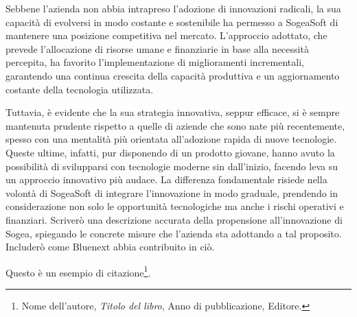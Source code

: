 Sebbene l'azienda non abbia intrapreso l'adozione di innovazioni radicali, la sua capacità di evolversi in modo costante e sostenibile ha permesso a SogeaSoft di mantenere una posizione competitiva nel mercato. L'approccio adottato, che prevede l'allocazione di risorse umane e finanziarie in base alla necessità percepita, ha favorito l'implementazione di miglioramenti incrementali, garantendo una continua crescita della capacità produttiva e un aggiornamento costante della tecnologia utilizzata. 

Tuttavia, è evidente che la sua strategia innovativa, seppur efficace, si è sempre mantenuta prudente rispetto a quelle di aziende che sono nate più recentemente, spesso con una mentalità più orientata all'adozione rapida di nuove tecnologie. Queste ultime, infatti, pur disponendo di un prodotto giovane, hanno avuto la possibilità di svilupparsi con tecnologie moderne sin dall'inizio, facendo leva su un approccio innovativo più audace. La differenza fondamentale risiede nella volontà di SogeaSoft di integrare l'innovazione in modo graduale, prendendo in considerazione non solo le opportunità tecnologiche ma anche i rischi operativi e finanziari.
    Scriverò una descrizione accurata della propensione all’innovazione di Sogea, spiegando le concrete
    misure che l’azienda sta adottando a tal proposito. Includerò come Bluenext abbia contribuito in ciò.

    Questo è un esempio di citazione\footnote{\small Nome dell'autore, \emph{Titolo del libro}, Anno di pubblicazione, Editore.}.
